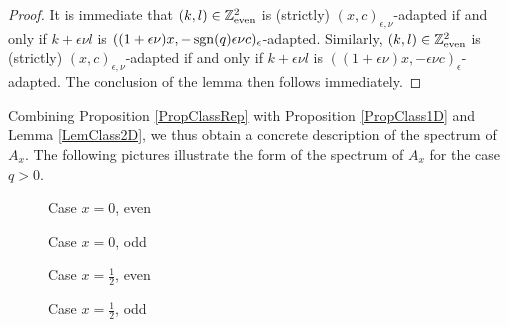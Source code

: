 \begin{proof} It is immediate that $(k,l)\in \mathbb{Z}^2_{\mathrm{even}}$ is (strictly) $(x,c)_{\epsilon,\nu}$-adapted if and only if $k+\epsilon\nu l$ is $((1+\epsilon\nu)x,-\operatorname{\mathrm{sgn}}(q)\epsilon\nu c)_{\epsilon}$-adapted. Similarly, $(k,l)\in \mathbb{Z}^2_{\mathrm{even}}$ is (strictly) $(x,c)_{\epsilon,\nu}$-adapted if and only if $k+\epsilon\nu l$ is $((1+\epsilon\nu)x,-\epsilon\nu c)_{\epsilon}$-adapted. The conclusion of the lemma then follows immediately.
\end{proof}

Combining Proposition \ref{PropClassRep} with Proposition \ref{PropClass1D} and Lemma \ref{LemClass2D}, we thus obtain a concrete description of the spectrum of $A_x$. The following pictures illustrate the form of the spectrum of $A_x$ for the case $q>0$.

\begin{figure}[h]
  \centering

  \caption{Case $x=0$, even}
\label{figy}
\end{figure}

\begin{figure}[h]
  \centering

  \caption{Case $x=0$, odd}
\label{figy}
\end{figure}


\begin{figure}[h]
  \centering

  \caption{Case $x=\frac{1}{2}$, even}
\label{figy}
\end{figure}


\begin{figure}[h]
  \centering
  
  
  \caption{Case $x=\frac{1}{2}$, odd}
\label{figy}
\end{figure}

%










